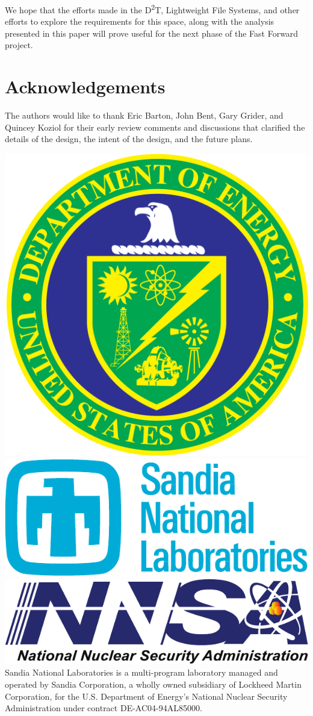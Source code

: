 \documentclass[conference]{IEEEtran}
\newcommand{\DDTns}{D\textsuperscript{2}T}
\begin{document}
We hope that the efforts made in the \DDTns, Lightweight File Systems, and
other efforts to explore the requirements for this space, along with the
analysis presented in this paper will prove useful for the next phase of the
Fast Forward project.

\section{Acknowledgements}
The authors would like to thank Eric Barton, John Bent, Gary Grider, and
Quincey Koziol for their early review comments and discussions that clarified
the details of the design, the intent of the design, and the future plans.

\includegraphics[scale=0.07]{logos/doe_logo}
\includegraphics[scale=0.30]{logos/snl_logo}
\includegraphics[scale=0.35]{logos/nnsa_logo}
Sandia National Laboratories is a multi-program laboratory managed and operated
by Sandia Corporation, a wholly owned subsidiary of Lockheed Martin
Corporation, for the U.S. Department of Energy's National Nuclear Security
Administration under contract DE-AC04-94AL85000.




\vfill\eject
\end{document}
